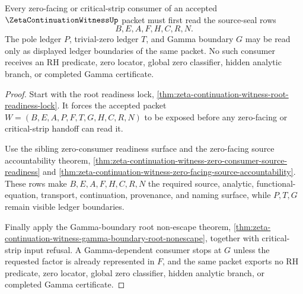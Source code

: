 \begin{theorem}
\label{thm:zeta-continuation-witness-root-readiness-source-seal}
Every zero-facing or critical-strip consumer of an accepted $\ZetaContinuationWitnessUp$ packet must first read the source-seal rows
$$
B,E,A,F,H,C,R,N .
$$
The pole ledger $P$, trivial-zero ledger $T$, and Gamma boundary $G$ may be read only as displayed ledger boundaries of the same packet. No such consumer receives an RH predicate, zero locator, global zero classifier, hidden analytic branch, or completed Gamma certificate.
\end{theorem}
\begin{proof}
Start with the root readiness lock,
\autoref{thm:zeta-continuation-witness-root-readiness-lock}. It forces the
accepted packet $W=(B,E,A,P,F,T,G,H,C,R,N)$ to be exposed before any
zero-facing or critical-strip handoff can read it.

Use the sibling zero-consumer readiness surface and the zero-facing source
accountability theorem,
\autoref{thm:zeta-continuation-witness-zero-consumer-source-readiness} and
\autoref{thm:zeta-continuation-witness-zero-facing-source-accountability}.
These rows make $B,E,A,F,H,C,R,N$ the required source, analytic,
functional-equation, transport, continuation, provenance, and naming surface,
while $P,T,G$ remain visible ledger boundaries.

Finally apply the Gamma-boundary root non-escape theorem,
\autoref{thm:zeta-continuation-witness-gamma-boundary-root-nonescape}, together
with critical-strip input refusal. A Gamma-dependent consumer stops at $G$
unless the requested factor is already represented in $F$, and the same packet
exports no RH predicate, zero locator, global zero classifier, hidden analytic
branch, or completed Gamma certificate.
\end{proof}
